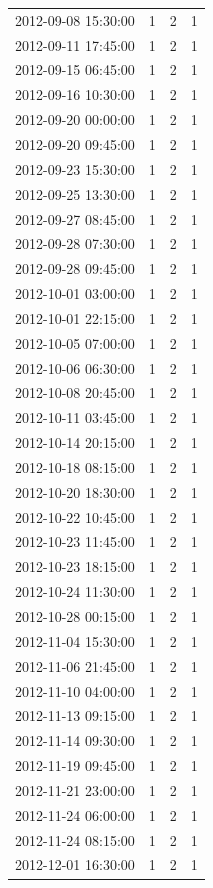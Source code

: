 \begin{tabular}{lrrr}
2012-09-08 15:30:00 & 1 & 2 & 1 \\
2012-09-11 17:45:00 & 1 & 2 & 1 \\
2012-09-15 06:45:00 & 1 & 2 & 1 \\
2012-09-16 10:30:00 & 1 & 2 & 1 \\
2012-09-20 00:00:00 & 1 & 2 & 1 \\
2012-09-20 09:45:00 & 1 & 2 & 1 \\
2012-09-23 15:30:00 & 1 & 2 & 1 \\
2012-09-25 13:30:00 & 1 & 2 & 1 \\
2012-09-27 08:45:00 & 1 & 2 & 1 \\
2012-09-28 07:30:00 & 1 & 2 & 1 \\
2012-09-28 09:45:00 & 1 & 2 & 1 \\
2012-10-01 03:00:00 & 1 & 2 & 1 \\
2012-10-01 22:15:00 & 1 & 2 & 1 \\
2012-10-05 07:00:00 & 1 & 2 & 1 \\
2012-10-06 06:30:00 & 1 & 2 & 1 \\
2012-10-08 20:45:00 & 1 & 2 & 1 \\
2012-10-11 03:45:00 & 1 & 2 & 1 \\
2012-10-14 20:15:00 & 1 & 2 & 1 \\
2012-10-18 08:15:00 & 1 & 2 & 1 \\
2012-10-20 18:30:00 & 1 & 2 & 1 \\
2012-10-22 10:45:00 & 1 & 2 & 1 \\
2012-10-23 11:45:00 & 1 & 2 & 1 \\
2012-10-23 18:15:00 & 1 & 2 & 1 \\
2012-10-24 11:30:00 & 1 & 2 & 1 \\
2012-10-28 00:15:00 & 1 & 2 & 1 \\
2012-11-04 15:30:00 & 1 & 2 & 1 \\
2012-11-06 21:45:00 & 1 & 2 & 1 \\
2012-11-10 04:00:00 & 1 & 2 & 1 \\
2012-11-13 09:15:00 & 1 & 2 & 1 \\
2012-11-14 09:30:00 & 1 & 2 & 1 \\
2012-11-19 09:45:00 & 1 & 2 & 1 \\
2012-11-21 23:00:00 & 1 & 2 & 1 \\
2012-11-24 06:00:00 & 1 & 2 & 1 \\
2012-11-24 08:15:00 & 1 & 2 & 1 \\
2012-12-01 16:30:00 & 1 & 2 & 1 \\

\end{tabular}
